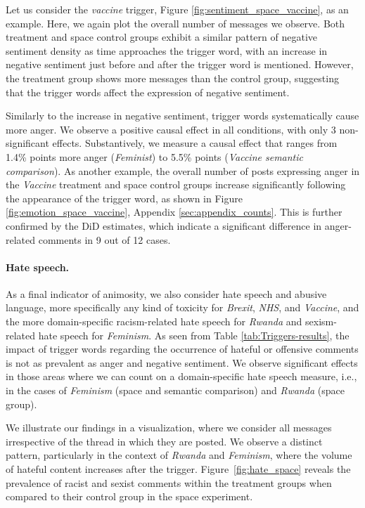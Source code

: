 Let us consider the \textit{vaccine} trigger, Figure \ref{fig:sentiment_space_vaccine}, as an example. Here, we again plot the overall number of messages we observe. Both treatment and space control groups exhibit a similar pattern of negative sentiment density as time approaches the trigger word, with an increase in negative sentiment just before and after the trigger word is mentioned. However, the treatment group shows more messages than the control group, suggesting that the trigger words affect the expression of negative sentiment.


Similarly to the increase in negative sentiment, trigger words systematically cause more anger. We observe a positive causal effect in all conditions, with only 3 non-significant effects. Substantively, we measure a causal effect that ranges from 1.4\% points more anger (\textit{Feminist}) to 5.5\% points (\textit{Vaccine semantic comparison}). As another example, the overall number of posts expressing anger in the \textit{Vaccine} treatment and space control groups increase significantly following the appearance of the trigger word, as shown in Figure \ref{fig:emotion_space_vaccine}, Appendix \ref{sec:appendix_counts}. This is further confirmed by the DiD estimates, which indicate a significant difference in anger-related comments in 9 out of 12 cases.



\paragraph{Hate speech.}
As a final indicator of animosity, we also consider hate speech and abusive language, more specifically any kind of toxicity for \textit{Brexit}, \textit{NHS}, and \textit{Vaccine}, and the more domain-specific racism-related hate speech for \textit{Rwanda} and sexism-related hate speech for \textit{Feminism}. As seen from Table \ref{tab:Triggers-results}, the impact of trigger words regarding the occurrence of hateful or offensive comments is not as prevalent as anger and negative sentiment. We observe significant effects in those areas where we can count on a domain-specific hate speech measure, i.e., in the cases of \textit{Feminism} (space and semantic comparison) and \textit{Rwanda} (space group).

We illustrate our findings in a visualization, where we consider all messages irrespective of the thread in which they are posted. We observe a distinct pattern, particularly in the context of \textit{Rwanda} and \textit{Feminism}, where the volume of hateful content increases after the trigger. Figure~\ref{fig:hate_space} reveals the prevalence of racist and sexist comments within the treatment groups when compared to their control group in the space experiment. 


